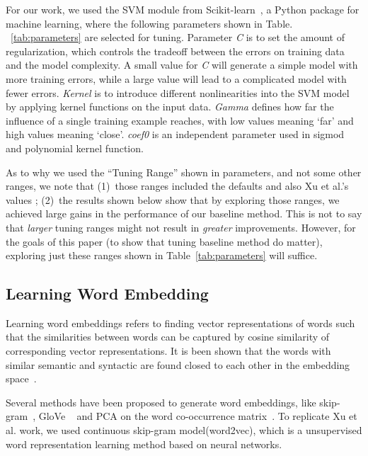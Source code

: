 \documentclass[sigconf,review, anonymous]{acmart}
\theoremstyle{break}
\newcommand{\tab}[1]{Table~\ref{tab:#1}}
\begin{document}
For our work, we used the SVM module from Scikit-learn~\cite{scikit-learn}, a Python package for machine learning,
where the following parameters shown in Table. ~\ref{tab:parameters} are selected for tuning.
Parameter {\it C} is to set the amount of regularization, which controls the tradeoff between
the errors on training data and the model complexity.  A small value for {\it C} will generate 
a simple model with more training errors, while a large value will lead to a complicated model with fewer
errors. {\it Kernel} is to introduce different nonlinearities into the SVM model by applying kernel functions
on the input data. {\it Gamma } defines how far the influence of a single training example reaches, 
with low values meaning `far' and high values meaning `close'. {\it coef0} is an independent parameter used
in sigmod and  polynomial kernel function.

As to why we used the ``Tuning Range'' shown in {parameters}, and not some other ranges,
we note that (1)~those ranges included the defaults and also Xu et al.'s values ; (2)~the results shown below
show that by exploring those ranges,  we achieved large gains in the performance of our baseline method.
This is not to say that {\em larger} tuning ranges might not result in {\em greater} improvements.
However, for the goals of this paper (to show that tuning baseline method do matter), exploring
just these ranges shown in \tab{parameters} will suffice.




\subsection{Learning Word Embedding}
Learning word embeddings refers to finding vector representations
of words such that the similarities between words can be captured by cosine similarity of corresponding 
vector representations. It is been shown that the words with similar semantic and syntactic are found closed
to each other in the embedding space~\cite{mikolov2013distributed}.

Several methods have been proposed to generate word embeddings, 
like skip-gram~\cite{mikolov2013distributed}, GloVe ~\cite{pennington2014glove}
and PCA on the word co-occurrence matrix~\cite{lebret2013word}. To replicate Xu et al. work,
we used continuous skip-gram model(word2vec),  which is a unsupervised word representation learning method based on
neural networks. 
\end{document}
